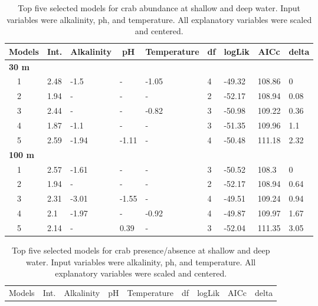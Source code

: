 \documentclass[letterpaper,12pt]{article}\usepackage[]{graphicx}\usepackage[]{color}
\begin{document}
\begin{landscape}
\centering\vspace*{\fill}
\begin{table}[!tbp]
{\scriptsize
\caption{Top five selected models for crab abundance at shallow and deep water. Input variables were alkalinity, ph, and temperature. All explanatory variables were scaled and centered.\label{tab:abutab}} 
\begin{center}
\begin{tabular}{lllllllll}
\hline\hline
\multicolumn{1}{l}{Models}&\multicolumn{1}{c}{Int.}&\multicolumn{1}{c}{Alkalinity}&\multicolumn{1}{c}{pH}&\multicolumn{1}{c}{Temperature}&\multicolumn{1}{c}{df}&\multicolumn{1}{c}{logLik}&\multicolumn{1}{c}{AICc}&\multicolumn{1}{c}{delta}\tabularnewline
\hline
{\bfseries 30 m}&&&&&&&&\tabularnewline
~~1&2.48&-1.5&-&-1.05&4&-49.32&108.86&0\tabularnewline
~~2&1.94&-&-&-&2&-52.17&108.94&0.08\tabularnewline
~~3&2.44&-&-&-0.82&3&-50.98&109.22&0.36\tabularnewline
~~4&1.87&-1.1&-&-&3&-51.35&109.96&1.1\tabularnewline
~~5&2.59&-1.94&-1.11&-&4&-50.48&111.18&2.32\tabularnewline
\hline
{\bfseries 100 m}&&&&&&&&\tabularnewline
~~1&2.57&-1.61&-&-&3&-50.52&108.3&0\tabularnewline
~~2&1.94&-&-&-&2&-52.17&108.94&0.64\tabularnewline
~~3&2.31&-3.01&-1.55&-&4&-49.51&109.24&0.94\tabularnewline
~~4&2.1&-1.97&-&-0.92&4&-49.87&109.97&1.67\tabularnewline
~~5&2.14&-&0.39&-&3&-52.04&111.35&3.05\tabularnewline
\hline
\end{tabular}\end{center}}
\end{table}
\begin{table}[!tbp]
{\scriptsize
\caption{Top five selected models for crab presence/absence at shallow and deep water. Input variables were alkalinity, ph, and temperature. All explanatory variables were scaled and centered.\label{tab:patab}} 
\begin{center}
\begin{tabular}{lllllllll}
\hline\hline
\multicolumn{1}{l}{Models}&\multicolumn{1}{c}{Int.}&\multicolumn{1}{c}{Alkalinity}&\multicolumn{1}{c}{pH}&\multicolumn{1}{c}{Temperature}&\multicolumn{1}{c}{df}&\multicolumn{1}{c}{logLik}&\multicolumn{1}{c}{AICc}&\multicolumn{1}{c}{delta}\tabularnewline

\end{tabular}
\end{center}}
\end{table}
\end{landscape}
\end{document}
